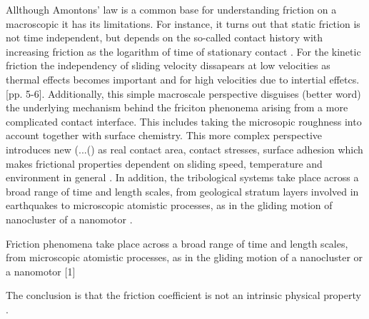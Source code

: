 Allthough Amontons’ law is a common base for understanding friction on a macroscopic it has its limitations. For instance, it turns out that static
friction is not time independent, but depends on the so-called contact history with increasing friction as the logarithm of time of stationary
contact \cite{dieterich_1972}. For the kinetic friction the independency of sliding velocity dissapears at low velocities as thermal effects
becomes important and for high velocities due to intertial effetcs. \cite{gnecco_meyer_2015}[pp. 5-6]. Additionally, this simple macroscale perspective disguises (better word) the underlying mechanism behind the friciton phenonema arising from a more complicated contact interface. This includes taking the microsopic roughness into account together with surface chemistry. This more complex perspective introduces new (...() as real contact area, contact stresses, surface adhesion which makes frictional properties dependent on sliding speed, temperature and environment in general \cite{kim_nano-scale_2009}. In addition, the tribological systems take place across a broad range of time and length scales, from geological stratum layers involved in earthquakes \cite{kim_nano-scale_2009} to microscopic atomistic processes, as in the gliding motion of nanocluster of a nanomotor \cite{Manini_2016}.


Friction phenomena take place across a broad range of time and length scales, from microscopic atomistic processes, as in the gliding motion of a nanocluster or a nanomotor [1]


The conclusion is that the friction coefficient is not an intrinsic physical property \cite{Szlufarska_2008}.








